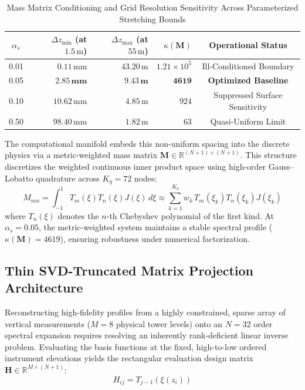 \begin{table}[h]
\centering
\caption{Mass Matrix Conditioning and Grid Resolution Sensitivity Across Parameterized Stretching Bounds}
\label{tab:stretch_sensitivity}
\begin{tabular}{c|rrrc}
\hline
$\alpha_s$ & $\Delta z_{\min}$ (at $1.5\,\text{m}$) & $\Delta z_{\max}$ (at $55\,\text{m}$) & $\kappa(\mathbf{M})$ & Operational Status \\
\hline
0.01 & $0.11\,\text{mm}$ & $43.20\,\text{m}$ & $1.21 \times 10^5$ & Ill-Conditioned Boundary \\
0.05 & $\mathbf{2.85\,\text{mm}}$ & $\mathbf{9.43\,\text{m}}$ & $\mathbf{4619}$ & \textbf{Optimized Baseline} \\
0.10 & $10.62\,\text{mm}$ & $4.85\,\text{m}$ & $924$ & Suppressed Surface Sensitivity \\
0.50 & $98.40\,\text{mm}$ & $1.82\,\text{m}$ & $63$ & Quasi-Uniform Limit \\
\hline
\end{tabular}
\end{table}

The computational manifold embeds this non-uniform spacing into the discrete physics via a metric-weighted mass matrix $\mathbf{M} \in \mathbb{R}^{(N+1) \times (N+1)}$. This structure discretizes the weighted continuous inner product space using high-order Gauss--Lobatto quadrature across $K_q = 72$ nodes:
\begin{equation}
M_{mn} = \int_{-1}^{1} T_m(\xi) T_n(\xi) J(\xi) \, d\xi \approx \sum_{k=1}^{K_q} w_k \, T_m(\xi_k) T_n(\xi_k) J(\xi_k)
\label{eq:mass_matrix_quad}
\end{equation}
where $T_n(\xi)$ denotes the $n$-th Chebyshev polynomial of the first kind. At $\alpha_s = 0.05$, the metric-weighted system maintains a stable spectral profile ($\kappa(\mathbf{M}) = 4619$), ensuring robustness under numerical factorization.

\subsection{Thin SVD-Truncated Matrix Projection Architecture}
\label{sec:methods:svd}

Reconstructing high-fidelity profiles from a highly constrained, sparse array of vertical measurements ($M = 8$ physical tower levels) onto an $N=32$ order spectral expansion requires resolving an inherently rank-deficient linear inverse problem. Evaluating the basis functions at the fixed, high-to-low ordered instrument elevations yields the rectangular evaluation design matrix $\mathbf{H} \in \mathbb{R}^{M \times (N+1)}$:
\begin{equation}
H_{ij} = T_{j-1}(\xi(z_i))
\label{eq:h_matrix_def}
\end{equation}

